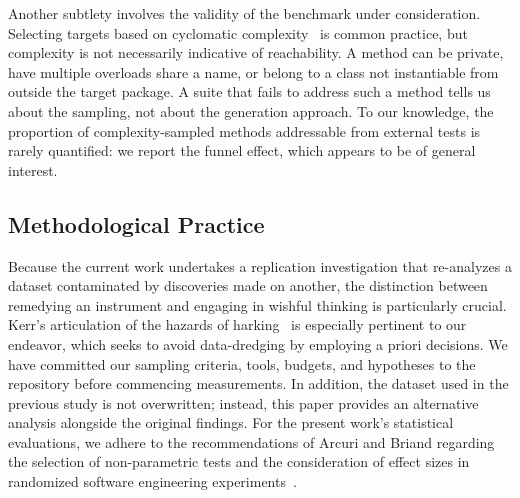 Another subtlety involves the validity of the benchmark under consideration. Selecting targets
based on cyclomatic complexity~\cite{mccabe1976complexity} is common practice, but complexity
is not necessarily indicative of reachability. A method can be private, have multiple overloads
share a name, or belong to a class not instantiable from outside the target package. A suite
that fails to address such a method tells us about the sampling, not about the generation
approach. To our knowledge, the proportion of complexity-sampled methods addressable from
external tests is rarely quantified: we report the funnel effect, which appears to be of
general interest.

\subsection{Methodological Practice}

Because the current work undertakes a replication investigation that re-analyzes a dataset
contaminated by discoveries made on another, the distinction between remedying an instrument
and engaging in wishful thinking is particularly crucial. Kerr's articulation of the hazards
of harking~\cite{kerr1998harking} is especially pertinent to our endeavor, which seeks to
avoid data-dredging by employing a priori decisions. We have committed our sampling criteria,
tools, budgets, and hypotheses to the repository before commencing measurements. In addition,
the dataset used in the previous study is not overwritten; instead, this paper provides an
alternative analysis alongside the original findings. For the present work's statistical
evaluations, we adhere to the recommendations of Arcuri and Briand regarding the selection of
non-parametric tests and the consideration of effect sizes in randomized software engineering
experiments~\cite{arcuri2014hitchhiker}.
